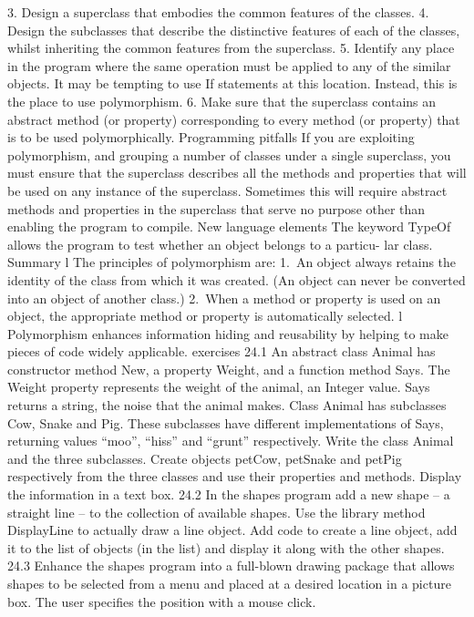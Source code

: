 3.	Design a superclass that embodies the common features of the classes.
4.	Design the subclasses that describe the distinctive features of each of the classes, whilst inheriting the common features from the superclass.
5.	Identify any place in the program where the same operation must be applied to any of the similar objects. It may be tempting to use If statements at this location. Instead, this is the place to use polymorphism.
6.	Make sure that the superclass contains an abstract method (or property) corresponding to every method (or property) that is to be used polymorphically.
Programming pitfalls
If you are exploiting polymorphism, and grouping a number of classes under a single superclass, you must ensure that the superclass describes all the methods and properties that will be used on any instance of the superclass. Sometimes this will require abstract methods and properties in the superclass that serve no purpose other than enabling the program to compile.
New language elements
The keyword TypeOf allows the program to test whether an object belongs to a particu-
lar class.
Summary
l	The principles of polymorphism are:
1. An object always retains the identity of the class from which it was created. (An object can never be converted into an object of another class.)
2. When a method or property is used on an object, the appropriate method or property is automatically selected.
l	Polymorphism enhances information hiding and reusability by helping to make pieces of code widely applicable.
exercises
24.1	An abstract class Animal has constructor method New, a property Weight, and a function method Says. The Weight property represents the weight of the animal, an Integer value. Says returns a string, the noise that the animal makes. Class Animal has subclasses Cow, Snake and Pig. These subclasses have different implementations of Says, returning values “moo”, “hiss” and “grunt” respectively. Write the class Animal and the three subclasses. Create objects petCow, petSnake and petPig respectively from the three classes and use their properties and methods. Display 
the information in a text box.
24.2	In the shapes program add a new shape – a straight line – to the collection of available shapes. Use the library method DisplayLine to actually draw a line 
object. Add code to create a line object, add it to the list of objects (in the list) 
and display it along with the other shapes.
24.3	Enhance the shapes program into a full-blown drawing package that allows shapes to be selected from a menu and placed at a desired location in a picture box. The user speciﬁes the position with a mouse click.
